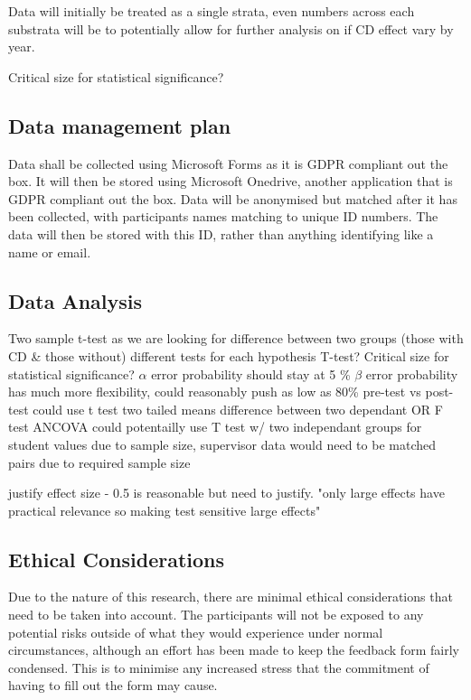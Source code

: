 \documentclass[lettersize,journal]{IEEEtran}
\begin{document}
        Data will initially be treated as a single strata, even numbers across each substrata will be to potentially allow for further analysis on if CD effect vary by year.

        Critical size for statistical significance?
    
    \subsection{Data management plan}
        Data shall be collected using Microsoft Forms as it is GDPR compliant out the box. It will then be stored using Microsoft Onedrive, another application that is GDPR compliant out the box.
        Data will be anonymised but matched after it has been collected, with participants names matching to unique ID numbers. The data will then be stored with this ID, rather than anything identifying like a name or email.
    
    \subsection{Data Analysis}
        Two sample t-test as we are looking for difference between two groups (those with CD \& those without)
        different tests for each hypothesis
        T-test? Critical size for statistical significance?
        $\alpha$ error probability should stay at 5 \%
        $\beta$ error probability has much more flexibility, could reasonably push as low as 80\%
        pre-test vs post-test could use t test two tailed means difference between two dependant OR F test ANCOVA
        could potentailly use T test w/ two independant groups for student values due to sample size, supervisor data would need to be matched pairs due to required sample size

        justify effect size - 0.5 is reasonable but need to justify. "only large effects have practical relevance so making test sensitive large effects"

    \subsection{Ethical Considerations}
        Due to the nature of this research, there are minimal ethical considerations that need to be taken into account. The participants will not be exposed to any potential risks outside of what they would experience under normal circumstances, although an effort has been made to keep the feedback form fairly condensed. This is to minimise any increased stress that the commitment of having to fill out the form may cause.
    
\end{document}

